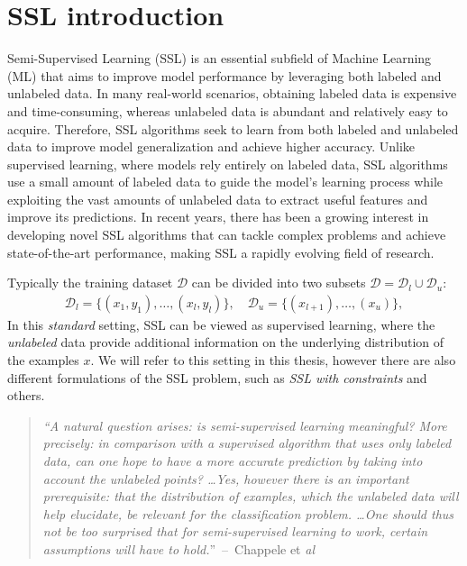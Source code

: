 \section{SSL introduction}
\label{sec:ssl-introduction}
Semi-Supervised Learning (SSL) is an essential subfield of Machine Learning (ML) that aims to improve model performance by leveraging 
both labeled and unlabeled data. In many real-world scenarios, obtaining labeled data is expensive and time-consuming, whereas 
unlabeled data is abundant and relatively easy to acquire. Therefore, SSL algorithms seek to learn from both labeled and unlabeled 
data to improve model generalization and achieve higher accuracy. Unlike supervised learning, where models rely entirely on labeled 
data, SSL algorithms use a small amount of labeled data to guide the model's learning process while exploiting the vast amounts of 
unlabeled data to extract useful features and improve its predictions. In recent years, there has been a growing interest in developing
novel SSL algorithms that can tackle complex problems and achieve state-of-the-art performance, making SSL a rapidly evolving field of 
research. 

Typically the training dataset $\mathcal{D}$ can be divided into two subsets $\mathcal{D} = \mathcal{D}_l \cup \mathcal{D}_u$:
\begin{align*}
    \mathcal{D}_l = \{(x_1,y_1),\dots, (x_l,y_l)\},\quad \mathcal{D}_u = \{(x_{l+1}),\dots,(x_{u})\},
\end{align*}
In this \textit{standard} setting, SSL can be viewed as supervised learning, where 
the \textit{unlabeled} data provide additional information on the underlying distribution of the examples $x$.
We will refer to this setting in this thesis, however there are also different formulations of the SSL problem, such as \textit{SSL with constraints}
and others\cite[p. 1]{ssl-book-2006}.

\begin{quote}
    \textit{
    ``A natural question arises: is semi-supervised learning meaningful? More precisely:
    in comparison with a supervised algorithm that uses only labeled data, can one
    hope to have a more accurate prediction by taking into account the unlabeled
    points? \dots Yes, however there is an important prerequisite: that the
    distribution of examples, which the unlabeled data will help elucidate, be relevant
    for the classification problem.
    \dots One should thus not be too surprised that for semi-supervised learning to work,
    certain assumptions will have to hold.}''~--~Chappele et \textit{al}\cite[p. 4]{ssl-book-2006}
\end{quote}

